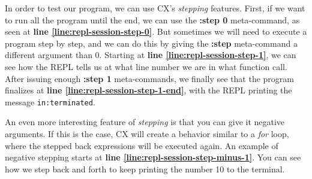 \documentclass[11pt,fleqn,openany]{book} %
\begin{document}
In order to test our program, we can use CX's \emph{stepping} features. First, if we want to run all the program until the end, we can use the \textbf{:step 0} meta-command, as seen at \textbf{line \ref{line:repl-session-step-0}}. But sometimes we will need to execute a program step by step, and we can do this by giving the \textbf{:step} meta-command a different argument than 0. Starting at \textbf{line \ref{line:repl-session-step-1}}, we can see how the REPL tells us at what line number we are in what function call. After issuing enough \textbf{:step 1} meta-commands, we finally see that the program finalizes at \textbf{line \ref{line:repl-session-step-1-end}}, with the REPL printing the message \lstinline{in:terminated}.

An even more interesting feature of \emph{stepping} is that you can give it negative arguments. If this is the case, CX will create a behavior similar to a \emph{for} loop, where the stepped back expressions will be executed again. An example of negative stepping starts at \textbf{line \ref{line:repl-session-step-minus-1}}. You can see how we step back and forth to keep printing the number 10 to the terminal.

\end{document}
